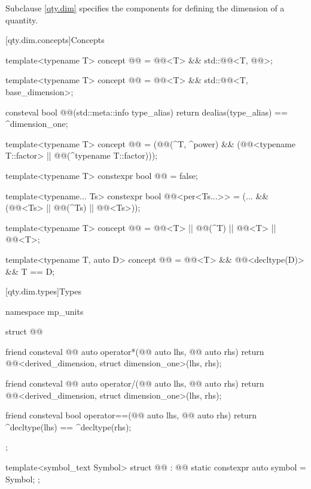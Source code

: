 \pnum
Subclause \ref{qty.dim} specifies the components
for defining the dimension of a quantity.

[qty.dim.concepts]{Concepts}

\begin{itemdecl}
template<typename T>
concept @@ = @@<T> && std::@@<T, @@>;

template<typename T>
concept @@ = @@<T> && std::@@<T, base_dimension>;

consteval bool @@(std::meta::info type_alias) {
  return dealias(type_alias) == ^dimension_one;
}

template<typename T>
concept @@ =
  (@@(^T, ^power) &&
   (@@<typename T::factor> || @@(^typename T::factor)));

template<typename T>
constexpr bool @@ = false;

template<typename... Ts>
constexpr bool @@<per<Ts...>> =
  (... && (@@<Ts> || @@(^Ts) || @@<Ts>));

template<typename T>
concept @@ =
  @@<T> || @@(^T) || @@<T> || @@<T>;

template<typename T, auto D>
concept @@ = @@<T> && @@<decltype(D)> && T{} == D;
\end{itemdecl}

[qty.dim.types]{Types}

\begin{codeblock}
namespace mp_units {

struct @@ {
  friend consteval @@ auto operator*(@@ auto lhs, @@ auto rhs)
  {
    return @@<derived_dimension, struct dimension_one>(lhs, rhs);
  }

  friend consteval @@ auto operator/(@@ auto lhs, @@ auto rhs)
  {
    return @@<derived_dimension, struct dimension_one>(lhs, rhs);
  }

  friend consteval bool operator==(@@ auto lhs, @@ auto rhs)
  {
    return ^decltype(lhs) == ^decltype(rhs);
  }
};

template<symbol_text Symbol>
struct @@ : @@ {
  static constexpr auto symbol = Symbol;
};

}
\end{codeblock}

